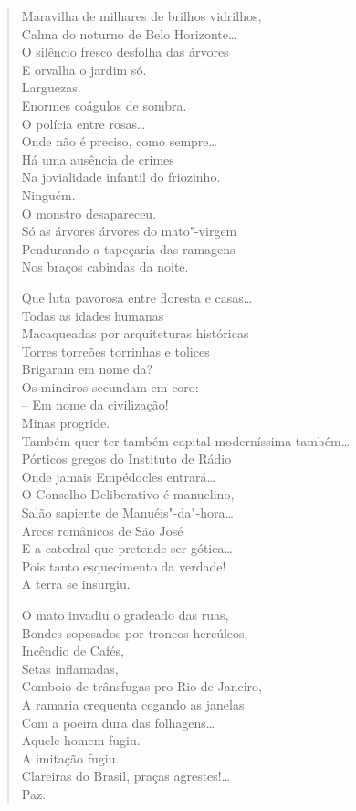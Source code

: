 \begin{verse}
Maravilha de milhares de brilhos vidrilhos,\\
Calma do noturno de Belo Horizonte\ldots{}\\
O silêncio fresco desfolha das árvores\\
E orvalha o jardim só.\\
Larguezas.\\
Enormes coágulos de sombra.\\
O polícia entre rosas\ldots{}\\
\quad{}Onde não é preciso, como sempre\ldots{}\\
Há uma ausência de crimes\\
Na jovialidade infantil do friozinho.\\
Ninguém.\\
O monstro desapareceu.\\
Só as árvores árvores do mato"-virgem\\
Pendurando a tapeçaria das ramagens\\
Nos braços cabindas da noite.

Que luta pavorosa entre floresta e casas\ldots{}\\
Todas as idades humanas\\
Macaqueadas por arquiteturas históricas\\
Torres torreões torrinhas e tolices\\
Brigaram em nome da?\\
Os mineiros secundam em coro:\\
-- Em nome da civilização!\\
Minas progride.\\
Também quer ter também capital moderníssima também\ldots{}\\
Pórticos gregos do Instituto de Rádio\\
Onde jamais Empédocles entrará\ldots{}\\
O Conselho Deliberativo é manuelino,\\
Salão sapiente de Manuéis"-da"-hora\ldots{}\\
Arcos românicos de São José\\
E a catedral que pretende ser gótica\ldots{}\\
Pois tanto esquecimento da verdade!\\
A terra se insurgiu.

O mato invadiu o gradeado das ruas,\\
Bondes sopesados por troncos hercúleos,\\
Incêndio de Cafés,\\
Setas inflamadas,\\
Comboio de trânsfugas pro Rio de Janeiro,\\
A ramaria crequenta cegando as janelas\\
Com a poeira dura das folhagens\ldots{}\\
Aquele homem fugiu.\\
A imitação fugiu.\\
Clareiras do Brasil, praças agrestes!\ldots{}\\
Paz.


\end{verse}
